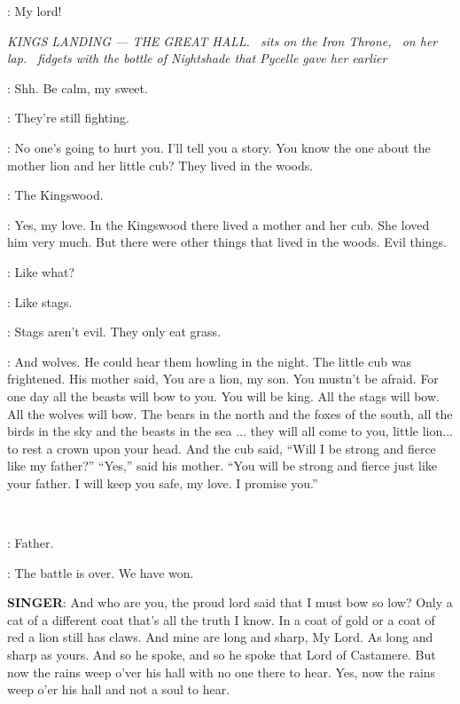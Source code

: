 
\PODRICK:  My lord!


\scene

\textit{KINGS LANDING --- THE GREAT HALL. \CERSEI ~sits on the Iron
Throne, \TOMMEN ~on her lap. \CERSEI ~fidgets with the bottle of
Nightshade that Pycelle gave her earlier} 

\CERSEI: Shh. 
Be calm, my sweet. 

\TOMMEN: They're still fighting. 

\CERSEI: No one's going to hurt you. 
I'll tell you a story. 
You know the one about the mother lion and her little cub? 
They lived in the woods. 

\TOMMEN: The Kingswood. 

\CERSEI: Yes, my love. 
In the Kingswood there lived a mother and her cub. 
She loved him very much. 
But there were other things that lived in the woods. 
Evil things. 

\TOMMEN: Like what? 

\CERSEI: Like stags. 

\TOMMEN: Stags aren't evil. 
They only eat grass. 

\CERSEI: And wolves. 
He could hear them howling in the night. 
The little cub was frightened. 
His mother said, You are a lion, my son. 
You mustn't be afraid. 
For one day all the beasts will bow to you. 
You will be king. 
All the stags will bow. All the wolves will bow. 
The bears in the north and the foxes of the south, 
all the birds in the sky 
and the beasts in the sea $\ldots$  they will all come to you, little lion$\ldots$ to rest a crown upon your head. 
And the cub said, ``Will I be strong and fierce like my father?''
``Yes,'' said his mother. ``You will be strong and fierce just like your father. I will keep you safe, my love. 
I promise you.''

\\

\CERSEI: Father. 

\TYWIN: The battle is over. We have won. 


\textbf{SINGER}:  And who are you, the proud lord said that I must bow so low? Only a cat of a different coat that's all the truth I know. In a coat of gold or a coat of red a lion still has claws. And mine are long and sharp, My Lord. As long and sharp as yours. And so he spoke, and so he spoke that Lord of Castamere. But now the rains weep o'ver his hall with no one there to hear.  Yes, now the rains weep o'er his hall and not a soul to hear. 


